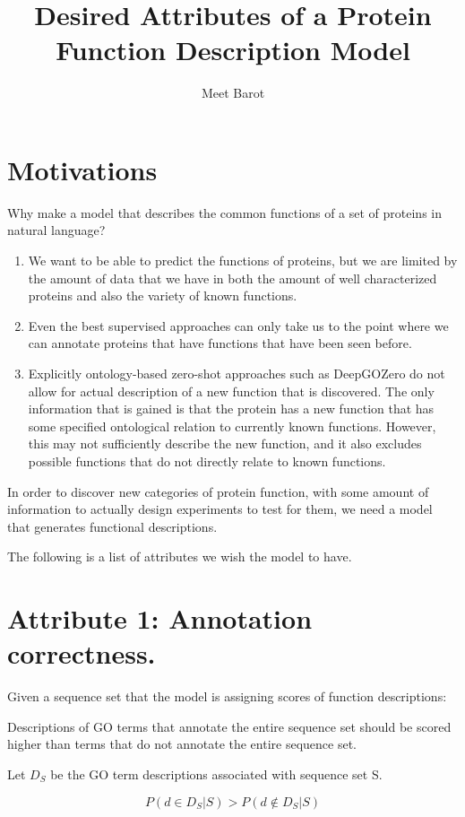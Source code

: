 \documentclass{specification}
\title{Desired Attributes of a Protein Function Description Model}
\author{Meet Barot}
\begin{document}
\maketitle

\section*{Motivations}
Why make a model that describes the common functions of a set of proteins in natural language?
\begin{enumerate}
    \item We want to be able to predict the functions of proteins, but we are limited by the amount of data that we have in both the amount of well characterized proteins and also the variety of known functions.
    \item Even the best supervised approaches can only take us to the point where we can annotate proteins that have functions that have been seen before.
    \item Explicitly ontology-based zero-shot approaches such as DeepGOZero \cite{DeepGOZero} do not allow for actual description of a new function that is discovered. The only information that is gained is that the protein has a new function that has some specified ontological relation to currently known functions. However, this may not sufficiently describe the new function, and it also excludes possible functions that do not directly relate to known functions.
\end{enumerate}
In order to discover new categories of protein function, with some amount of information to actually design experiments to test for them, we need a model that generates functional descriptions.

The following is a list of attributes we wish the model to have.

\section*{Attribute 1: Annotation correctness.}

Given a sequence set that the model is assigning scores of function descriptions:

Descriptions of GO terms that annotate the entire sequence set should be scored higher than terms that do not annotate the entire sequence set.

Let $D_{S}$ be the GO term descriptions associated with sequence set S.

\[P(d \in D_{S} | S) > P(d \notin D_{S} | S)\]
\end{document}
